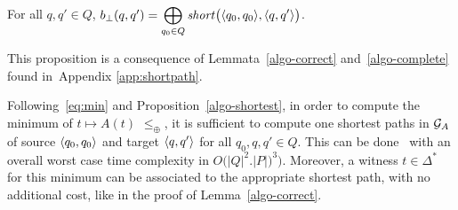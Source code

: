 \begin{proposition}\label{algo-shortest}
For all $q, q' \in Q$, 
$b_\bot(q, q') = \displaystyle\bigoplus_{q_0 \in Q} \mathit{short}\bigl(\< q_0, q_0>, \< q, q'>\bigr)$.
\end{proposition}
This proposition is a consequence of Lemmata~\ref{algo-correct} and~\ref{algo-complete} 
found in~Appendix \ref{app:shortpath}.

\medskip\noindent
Following~\eqref{eq:min} and Proposition~\ref{algo-shortest}, 
in order to compute the minimum of $t \mapsto A(t)$ \wrt $\leq_\oplus$, 
it is sufficient to compute one shortest paths in $\mathcal{G}_{A}$ of source
$\<q_0, q_0>$ and target $\<q, q'>$ for all $q_0, q, q' \in Q$.
This can be done~\cite{Mohri02semiring}  
with an overall worst case time complexity in $O\bigl(|Q|^2.|P|)^3\bigr)$. 
Moreover, a witness $t \in \Delta^*$ for this minimum can be associated to the appropriate
shortest path, with no additional cost, like in the proof of Lemma~\ref{algo-correct}.





